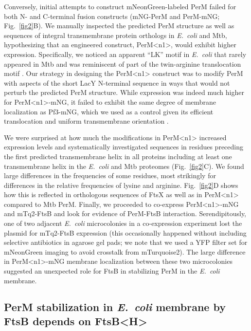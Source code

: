 \documentclass[twocolumn,pdflatex,sn-nature]{sn-jnl}%
\def\textsuperscript#1{<#1>}%
\newcommand\ec{\textit{E.~coli}}
\newcommand\mtb{Mtb}
\newcommand\ftsbH{FtsB\textsuperscript{H}}
\newcommand\permN{PerM\textsuperscript{n1}}
\begin{document}
Conversely, initial attempts to construct mNeonGreen-labeled PerM failed for both N- and C-terminal fusion constructs (mNG-PerM and PerM-mNG; Fig.~\ref{fig2}B).
We manually inspected the predicted PerM structure as well as sequences of integral transmembrane protein orthologs in \ec{} and \mtb{}, hypothesizing that an engineered construct, \permN{}, would exhibit higher expression.
Specifically, we noticed an apparent ``LK'' motif in \ec{} that rarely appeared in \mtb{} and was reminiscent of part of the twin-arginine translocation motif \citep{leeBacterialTwinArginineTranslocation2006}.
Our strategy in designing the \permN{} construct was to modify PerM with aspects of the short LacY N-terminal sequence in ways that would not perturb the predicted PerM structure.
While expression was indeed much higher for \permN{}-mNG, it failed to exhibit the same degree of membrane localization as Pf3-mNG, which we used as a control given its efficient translocation and uniform transmembrane orientation \citep{kieferNegativelyChargedAmino1997}.

We were surprised at how much the modifications in \permN{} increased expression levels and systematically investigated sequences in residues preceding the first predicted transmembrane helix in all proteins including at least one transmembrane helix in the \ec{} and \mtb{} proteomes (Fig.~\ref{fig2}C).
We found large differences in the frequencies of some residues, most strikingly for differences in the relative frequencies of lysine and arginine. Fig.~\ref{fig2}D shows how this is reflected in orthologous sequences of FtsX as well as in \permN{} compared to \mtb{} PerM.
Finally, we proceeded to co-express \permN{}-mNG and mTq2-FtsB and look for evidence of PerM-FtsB interaction.
Serendipitously, one of two adjacent \ec{} microcolonies in a co-expression experiment lost the plasmid for mTq2-FtsB expression (this occasionally happened without including selective antibiotics in agarose gel pads; we note that we used a YFP filter set for mNeonGreen imaging to avoid crosstalk from mTurquoise2).
The large difference in \permN{}-mNG membrane localization between these two microcolonies suggested an unexpected role for FtsB in stabilizing PerM in the \ec{} membrane.

\subsection{PerM stabilization in \ec{} membrane by FtsB depends on \ftsbH{}}
\end{document}
